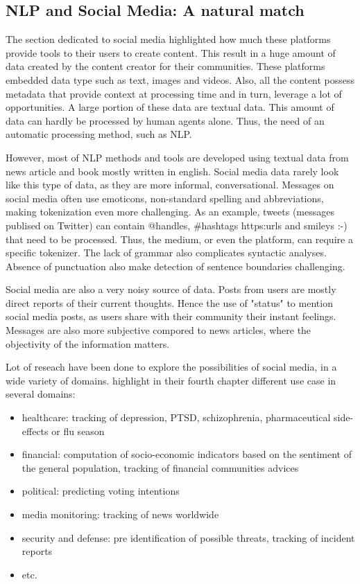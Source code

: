 \subsection{NLP and Social Media: A natural match}
The section dedicated to social media highlighted how much these platforms provide tools to their users to create content.
This result in a huge amount of data created by the content creator for their communities.  %
These platforms embedded data type such as text, images and videos.
Also, all the content possess metadata that provide context at processing time and in turn, leverage a lot of opportunities.
A large portion of these data are textual data.
This amount of data can hardly be processed by human agents alone.
Thus, the need of an automatic processing method, such as NLP.

However, most of NLP methods and tools are developed using textual data from news article and book mostly written in english.
Social media data rarely look like this type of data, as they are more informal, conversational.
Messages on social media often use emoticons, non-standard spelling and abbreviations, making tokenization even more challenging.
As an example, tweets (messages publised on Twitter) can contain @handles, \#hashtags https:\/\/urls and smileys :-) that need to be processed.
Thus, the medium, or even the platform, can require a specific tokenizer.
The lack of grammar also complicates syntactic analyses.
Absence of punctuation also make detection of sentence boundaries challenging.

Social media are also a very noisy source of data.
Posts from users are mostly direct reports of their current thoughts.
Hence the use of "status" to mention social media posts, as users share with their community their instant feelings.
Messages are also more subjective compored to news articles, where the objectivity of the information matters.

Lot of reseach have been done to explore the possibilities of social media, in a wide variety of domains.
highlight in their fourth chapter different use case in several domains:
\begin{itemize}
    \item healthcare: tracking of depression, PTSD, schizophrenia, pharmaceutical side-effects or flu season
    \item financial: computation of socio-economic indicators based on the sentiment of the general population, tracking of financial communities advices
    \item political: predicting voting intentions
    \item media monitoring: tracking of news worldwide
    \item security and defense: pre identification of possible threats, tracking of incident reports
    \item etc.
\end{itemize}


